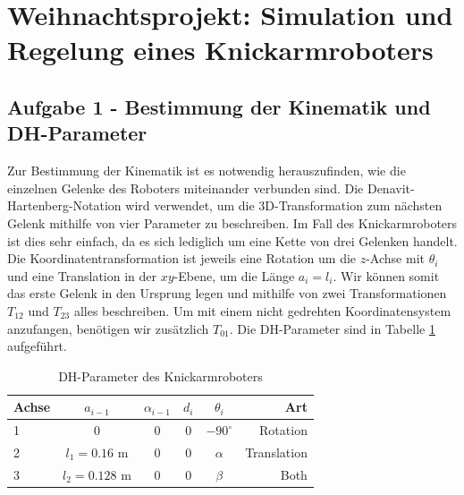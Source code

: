 \documentclass{MSM_latex}
\author{M. Denkinger, S. Eyes, J. Schnitzler}
\begin{document}
\section{Weihnachtsprojekt: Simulation und Regelung eines Knickarmroboters}

\subsection*{Aufgabe 1 - Bestimmung der Kinematik und DH-Parameter}

Zur Bestimmung der Kinematik ist es notwendig herauszufinden, wie die einzelnen Gelenke des Roboters miteinander verbunden sind.
Die Denavit-Hartenberg-Notation wird verwendet, um die 3D-Transformation zum nächsten Gelenk mithilfe von vier Parameter zu beschreiben. Im Fall des Knickarmroboters ist
dies sehr einfach, da es sich lediglich um eine Kette von drei Gelenken handelt. Die Koordinatentransformation ist jeweils eine Rotation um die $z$-Achse mit $\theta_i$
und eine Translation in der $xy$-Ebene, um die Länge $a_i = l_i$. Wir können somit das erste Gelenk in den Ursprung legen und mithilfe von zwei Transformationen $T_{12}$ und $T_{23}$ alles beschreiben. Um mit einem nicht gedrehten Koordinatensystem anzufangen, benötigen wir zusätzlich $T_{01}$. Die DH-Parameter sind in Tabelle \ref{tab:DH} aufgeführt.



\begin{table}[tb]
	\centering
	\begin{tabular}{lccccr}
		\toprule
		Achse & $a_{i-1}$ & $\alpha_{i-1}$ & $d_i$ & $\theta_i$ & Art \\
		\midrule
		1 & 0& 0& 0& $-90^\circ $& Rotation \\
		2 & $l_1 = 0.16 \text{ m}$& 0& 0& $\alpha$& Translation\\
		3 & $l_2 = 0.128 \text{ m}$& 0& 0& $\beta$& Both\\ 
		\bottomrule
	\end{tabular}
	\caption{DH-Parameter des Knickarmroboters}
	\label{tab:DH}
\end{table}
\end{document}
